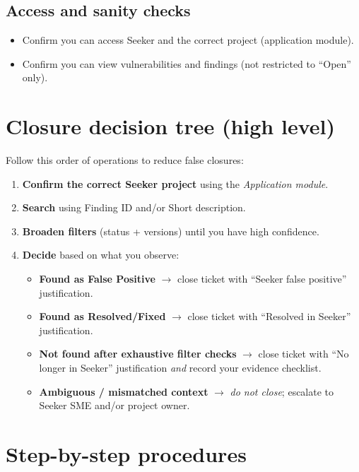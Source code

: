 \documentclass[11pt]{article}
\begin{document}
\subsection*{Access and sanity checks}
\begin{itemize}[leftmargin=*]
  \item Confirm you can access Seeker and the correct project (application module).
  \item Confirm you can view vulnerabilities and findings (not restricted to ``Open'' only).
\end{itemize}

\section{Closure decision tree (high level)}
Follow this order of operations to reduce false closures:

\begin{enumerate}[leftmargin=*]
  \item \textbf{Confirm the correct Seeker project} using the \textit{Application module}.
  \item \textbf{Search} using Finding ID and/or Short description.
  \item \textbf{Broaden filters} (status + versions) until you have high confidence.
  \item \textbf{Decide} based on what you observe:
  \begin{itemize}[leftmargin=*]
    \item \textbf{Found as False Positive} $\rightarrow$ close ticket with ``Seeker false positive'' justification.
    \item \textbf{Found as Resolved/Fixed} $\rightarrow$ close ticket with ``Resolved in Seeker'' justification.
    \item \textbf{Not found after exhaustive filter checks} $\rightarrow$ close ticket with ``No longer in Seeker'' justification \emph{and} record your evidence checklist.
    \item \textbf{Ambiguous / mismatched context} $\rightarrow$ \emph{do not close}; escalate to Seeker SME and/or project owner.
  \end{itemize}
\end{enumerate}

\section{Step-by-step procedures}
\end{document}
